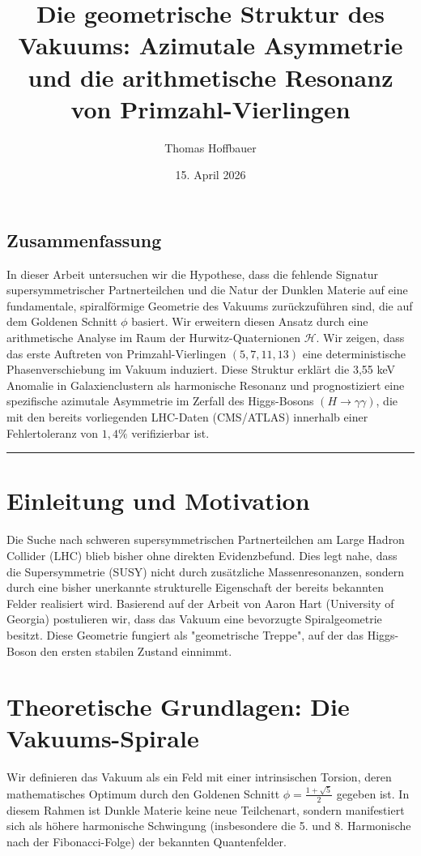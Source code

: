 \documentclass[12pt,a4paper]{article}
\title{\Large\textbf{Die geometrische Struktur des Vakuums: Azimutale Asymmetrie und die arithmetische Resonanz von Primzahl-Vierlingen}}
\author[1]{Thomas Hoffbauer}
\affil[1]{Bamberg, Deutschland \\ In Kooperation mit dem \#Energiedoku-Projekt}
\date{15. April 2026}
\begin{document}
	
	\maketitle
	\thispagestyle{fancy}
	
	\subsection*{Zusammenfassung}
	In dieser Arbeit untersuchen wir die Hypothese, dass die fehlende Signatur supersymmetrischer Partnerteilchen und die Natur der Dunklen Materie auf eine fundamentale, spiralförmige Geometrie des Vakuums zurückzuführen sind, die auf dem Goldenen Schnitt $\phi$ basiert. Wir erweitern diesen Ansatz durch eine arithmetische Analyse im Raum der Hurwitz-Quaternionen $\mathcal{H}$. Wir zeigen, dass das erste Auftreten von Primzahl-Vierlingen $(5, 7, 11, 13)$ eine deterministische Phasenverschiebung im Vakuum induziert. Diese Struktur erklärt die 3,55 keV Anomalie in Galaxienclustern als harmonische Resonanz und prognostiziert eine spezifische azimutale Asymmetrie im Zerfall des Higgs-Bosons $(H \to \gamma\gamma)$, die mit den bereits vorliegenden LHC-Daten (CMS/ATLAS) innerhalb einer Fehlertoleranz von $1{,}4\%$ verifizierbar ist.
	
	\vspace{1em}
	\hrule
	\vspace{1em}
	
	\section{Einleitung und Motivation}
	Die Suche nach schweren supersymmetrischen Partnerteilchen am Large Hadron Collider (LHC) blieb bisher ohne direkten Evidenzbefund. Dies legt nahe, dass die Supersymmetrie (SUSY) nicht durch zusätzliche Massenresonanzen, sondern durch eine bisher unerkannte strukturelle Eigenschaft der bereits bekannten Felder realisiert wird. Basierend auf der Arbeit von Aaron Hart (University of Georgia) postulieren wir, dass das Vakuum eine bevorzugte Spiralgeometrie besitzt. Diese Geometrie fungiert als "geometrische Treppe", auf der das Higgs-Boson den ersten stabilen Zustand einnimmt.
	
	\section{Theoretische Grundlagen: Die Vakuums-Spirale}
	Wir definieren das Vakuum als ein Feld mit einer intrinsischen Torsion, deren mathematisches Optimum durch den Goldenen Schnitt $\phi = \frac{1+\sqrt{5}}{2}$ gegeben ist. In diesem Rahmen ist Dunkle Materie keine neue Teilchenart, sondern manifestiert sich als höhere harmonische Schwingung (insbesondere die 5. und 8. Harmonische nach der Fibonacci-Folge) der bekannten Quantenfelder.
	
\end{document}
